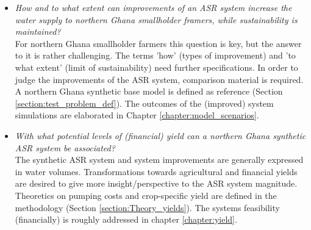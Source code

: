 \begin{itemize} 
\item{\textit{How and to what extent can improvements of an ASR system increase the water supply to northern Ghana smallholder framers, while sustainability is maintained?}
\smallskip \\
For northern Ghana smallholder farmers this question is key, but the answer to it is rather challenging. The terms 'how' (types of improvement) and 'to what extent' (limit of sustainability) need further specifications. In order to judge the improvements of the ASR system, comparison material is required. A northern Ghana synthetic base model is defined as reference (Section \ref{section:test_problem_def}). The outcomes of the (improved) system simulations are elaborated in Chapter \ref{chapter:model_scenarios}.}
\end{itemize}

\begin{itemize}
\item{\textit{With what potential levels of (financial) yield can a northern Ghana synthetic ASR system be associated?}
\smallskip \\
The synthetic ASR system and system improvements are generally expressed in water volumes. Transformations towards agricultural and financial yields are desired to give more insight/perspective to the ASR system magnitude. Theoretics on pumping costs and crop-specific yield are defined in the methodology (Section \ref{section:Theory_yields}). The systems feasibility (financially) is roughly addressed in chapter \ref{chapter:yield}.}
\end{itemize}

